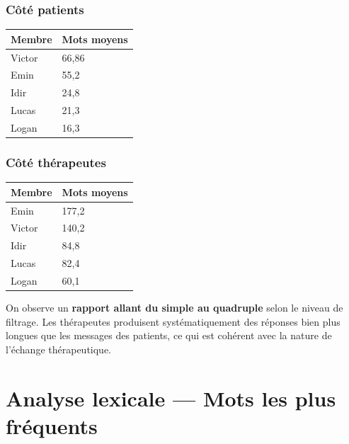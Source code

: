 \documentclass[12pt,a4paper]{article}
\begin{document}
\noindent
\begin{minipage}[t]{0.48\textwidth}
\vspace{0pt}
\subsubsection*{Côté patients}

\begin{center}
\begin{tabular}{ll}
\toprule
\textbf{Membre} & \textbf{Mots moyens} \\
\midrule
Victor & 66,86 \\
Emin   & 55,2  \\
Idir   & 24,8  \\
Lucas  & 21,3  \\
Logan  & 16,3  \\
\bottomrule
\end{tabular}
\end{center}
\end{minipage}
\hfill
\begin{minipage}[t]{0.48\textwidth}
\vspace{0pt}
\subsubsection*{Côté thérapeutes}

\begin{center}
\begin{tabular}{ll}
\toprule
\textbf{Membre} & \textbf{Mots moyens} \\
\midrule
Emin   & 177,2 \\
Victor & 140,2 \\
Idir   &  84,8 \\
Lucas  &  82,4 \\
Logan  &  60,1 \\
\bottomrule
\end{tabular}
\end{center}
\end{minipage}

On observe un \textbf{rapport allant du simple au quadruple} selon le niveau de filtrage. Les thérapeutes produisent systématiquement des réponses bien plus longues que les messages des patients, ce qui est cohérent avec la nature de l'échange thérapeutique.

\pagebreak
\section{Analyse lexicale --- Mots les plus fréquents}
\end{document}
